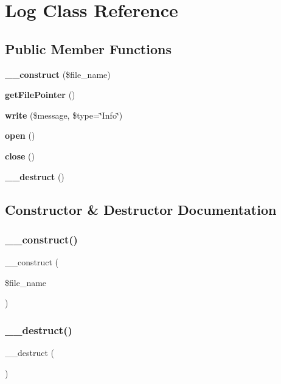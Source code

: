 \section{Log Class Reference}
\label{class_log}
\subsection*{Public Member Functions}
\begin{DoxyCompactItemize}
\item 
\textbf{ \+\_\+\+\_\+construct} (\$file\+\_\+name)
\item 
\textbf{ get\+File\+Pointer} ()
\item 
\textbf{ write} (\$message, \$type=\char`\"{}Info\char`\"{})
\item 
\textbf{ open} ()
\item 
\textbf{ close} ()
\item 
\textbf{ \+\_\+\+\_\+destruct} ()
\end{DoxyCompactItemize}


\subsection{Constructor \& Destructor Documentation}
\mbox{\label{class_log_a424ff9c7cdfbda288905fbac7e20b6ba}} 
\subsubsection{\+\_\+\+\_\+construct()}
{\footnotesize\ttfamily \+\_\+\+\_\+construct (\begin{DoxyParamCaption}\item[{}]{\$file\+\_\+name }\end{DoxyParamCaption})}

\mbox{\label{class_log_a421831a265621325e1fdd19aace0c758}} 
\subsubsection{\+\_\+\+\_\+destruct()}
{\footnotesize\ttfamily \+\_\+\+\_\+destruct (\begin{DoxyParamCaption}{ }\end{DoxyParamCaption})}



